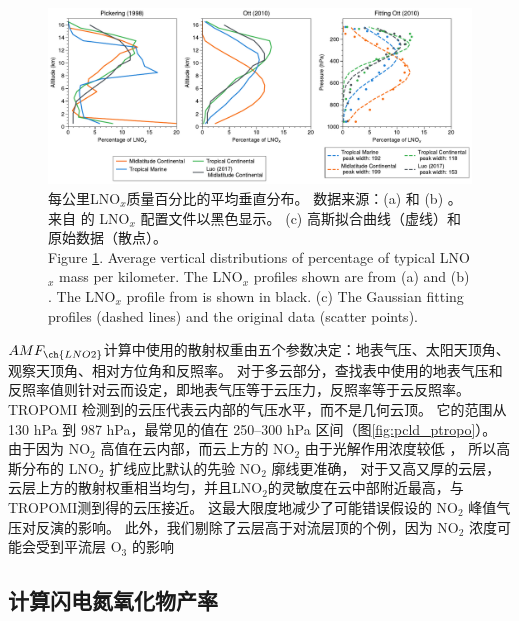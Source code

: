 \begin{figure}[!htbp]
\centering
\includegraphics[width=16cm]{./figures/arctic_lnox_profile.pdf}
\caption{
每公里LNO$_x$质量百分比的平均垂直分布。
数据来源：(a) \citet{Pickering.1998} 和 (b) \citet{Ott.2010}。
来自 \citet{Luo.2017} 的 LNO$_x$ 配置文件以黑色显示。
(c) 高斯拟合曲线（虚线）和原始数据（散点）。\\
Figure \ref{fig:arctic_lnox_profile}.
Average vertical distributions of percentage of typical LNO$_x$ mass per kilometer.
The LNO$_x$ profiles shown are from (a) \citet{Pickering.1998} and (b) \citet{Ott.2010}.
The LNO$_x$ profile from \citet{Luo.2017} is shown in black.
(c) The Gaussian fitting profiles (dashed lines) and the original data (scatter points).
}
\label{fig:arctic_lnox_profile}
\end{figure}

$AMF_{\ch{LNO2}}$计算中使用的散射权重由五个参数决定：地表气压、太阳天顶角、观察天顶角、相对方位角和反照率。
对于多云部分，查找表中使用的地表气压和反照率值则针对云而设定，即地表气压等于云压力，反照率等于云反照率。
TROPOMI 检测到的云压代表云内部的气压水平，而不是几何云顶\citep{Vasilkov.2008,Joiner.2012}。
它的范围从 130 hPa 到 987 hPa，最常见的值在 250--300 hPa 区间（图\ref{fig:pcld_ptropo}）。
由于因为 NO$_2$ 高值在云内部，而云上方的 NO$_2$ 由于光解作用浓度较低 \citep{Beirle.2009}，
所以高斯分布的 LNO$_2$ 扩线应比默认的先验 NO$_2$ 廓线更准确，
对于又高又厚的云层，云层上方的散射权重相当均匀，并且LNO$_2$的灵敏度在云中部附近最高，与 TROPOMI测到得的云压接近\citep{Beirle.2009}。
这最大限度地减少了可能错误假设的 NO$_2$ 峰值气压对反演的影响\citep{Laughner.2017}。
此外，我们剔除了云层高于对流层顶的个例，因为 NO$_2$ 浓度可能会受到平流层 O$_3$ 的影响\citep{Frey.2015a,Zhang.2022a}


\subsection*{计算闪电氮氧化物产率} \label{sec:calc_lnox_pe}

